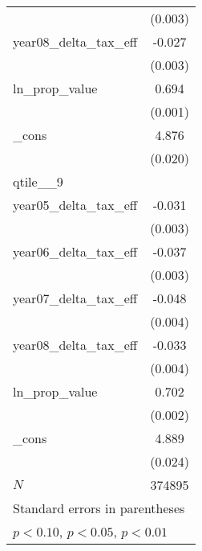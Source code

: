 {\begin{tabular}{l*{1}{c}}
            &     (0.003)         \\
[1em]
year08\_delta\_tax\_eff&      -0.027\sym{***}\\
            &     (0.003)         \\
[1em]
ln\_prop\_value&       0.694\sym{***}\\
            &     (0.001)         \\
[1em]
\_cons      &       4.876\sym{***}\\
            &     (0.020)         \\
\hline
qtile\_\_9    &                     \\
year05\_delta\_tax\_eff&      -0.031\sym{***}\\
            &     (0.003)         \\
[1em]
year06\_delta\_tax\_eff&      -0.037\sym{***}\\
            &     (0.003)         \\
[1em]
year07\_delta\_tax\_eff&      -0.048\sym{***}\\
            &     (0.004)         \\
[1em]
year08\_delta\_tax\_eff&      -0.033\sym{***}\\
            &     (0.004)         \\
[1em]
ln\_prop\_value&       0.702\sym{***}\\
            &     (0.002)         \\
[1em]
\_cons      &       4.889\sym{***}\\
            &     (0.024)         \\
\hline
\(N\)       &      374895         \\
\hline\hline
\multicolumn{2}{l}{\footnotesize Standard errors in parentheses}\\
\multicolumn{2}{l}{\footnotesize \sym{*} \(p<0.10\), \sym{**} \(p<0.05\), \sym{***} \(p<0.01\)}\\
\end{tabular}
}

